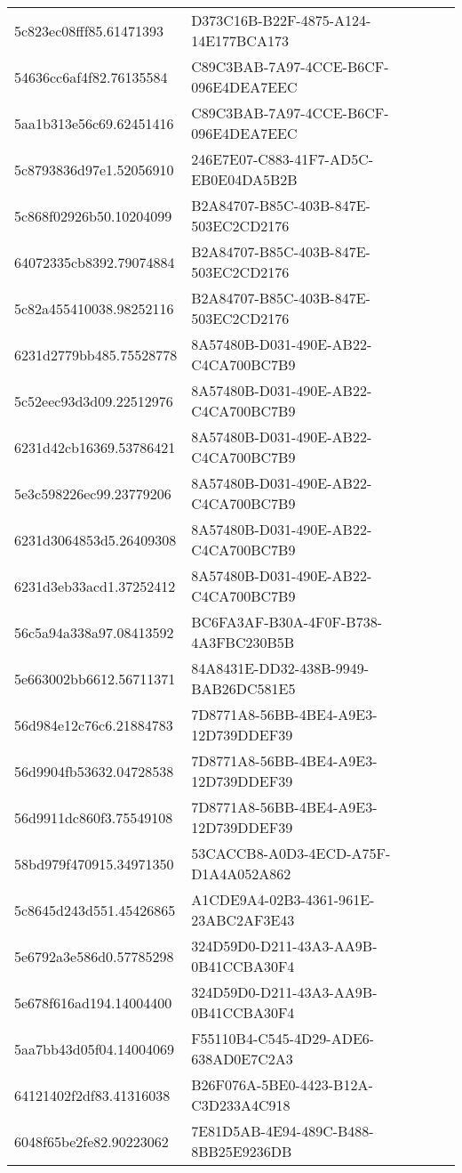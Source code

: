 \begin{tabular}{ll}
5c823ec08fff85.61471393 & D373C16B-B22F-4875-A124-14E177BCA173 \\
54636cc6af4f82.76135584 & C89C3BAB-7A97-4CCE-B6CF-096E4DEA7EEC \\
5aa1b313e56c69.62451416 & C89C3BAB-7A97-4CCE-B6CF-096E4DEA7EEC \\
5c8793836d97e1.52056910 & 246E7E07-C883-41F7-AD5C-EB0E04DA5B2B \\
5c868f02926b50.10204099 & B2A84707-B85C-403B-847E-503EC2CD2176 \\
64072335cb8392.79074884 & B2A84707-B85C-403B-847E-503EC2CD2176 \\
5c82a455410038.98252116 & B2A84707-B85C-403B-847E-503EC2CD2176 \\
6231d2779bb485.75528778 & 8A57480B-D031-490E-AB22-C4CA700BC7B9 \\
5c52eec93d3d09.22512976 & 8A57480B-D031-490E-AB22-C4CA700BC7B9 \\
6231d42cb16369.53786421 & 8A57480B-D031-490E-AB22-C4CA700BC7B9 \\
5e3c598226ec99.23779206 & 8A57480B-D031-490E-AB22-C4CA700BC7B9 \\
6231d3064853d5.26409308 & 8A57480B-D031-490E-AB22-C4CA700BC7B9 \\
6231d3eb33acd1.37252412 & 8A57480B-D031-490E-AB22-C4CA700BC7B9 \\
56c5a94a338a97.08413592 & BC6FA3AF-B30A-4F0F-B738-4A3FBC230B5B \\
5e663002bb6612.56711371 & 84A8431E-DD32-438B-9949-BAB26DC581E5 \\
56d984e12c76c6.21884783 & 7D8771A8-56BB-4BE4-A9E3-12D739DDEF39 \\
56d9904fb53632.04728538 & 7D8771A8-56BB-4BE4-A9E3-12D739DDEF39 \\
56d9911dc860f3.75549108 & 7D8771A8-56BB-4BE4-A9E3-12D739DDEF39 \\
58bd979f470915.34971350 & 53CACCB8-A0D3-4ECD-A75F-D1A4A052A862 \\
5c8645d243d551.45426865 & A1CDE9A4-02B3-4361-961E-23ABC2AF3E43 \\
5e6792a3e586d0.57785298 & 324D59D0-D211-43A3-AA9B-0B41CCBA30F4 \\
5e678f616ad194.14004400 & 324D59D0-D211-43A3-AA9B-0B41CCBA30F4 \\
5aa7bb43d05f04.14004069 & F55110B4-C545-4D29-ADE6-638AD0E7C2A3 \\
64121402f2df83.41316038 & B26F076A-5BE0-4423-B12A-C3D233A4C918 \\
6048f65be2fe82.90223062 & 7E81D5AB-4E94-489C-B488-8BB25E9236DB \\

\end{tabular}
